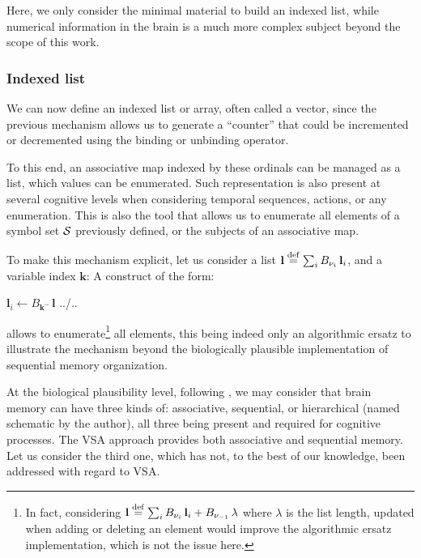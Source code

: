\documentclass[sn-mathphys]{sn-jnl}
\newcommand{\defq}{\stackrel {\rm def}{=}}
\begin{document}
Here, we only consider the minimal material to build an indexed list, while numerical information in the brain is a much more complex subject \cite{nieder_representation_2007} beyond the scope of this work.

\subsubsection{Indexed list} 
We can now define an indexed list or array, often called a vector, since the previous mechanism allows us to generate a ``counter'' that could be incremented or decremented using the binding or unbinding operator.

To this end, an associative map indexed by these ordinals can be managed as a list, which values can be enumerated. Such representation is also present at several cognitive levels when considering temporal sequences, actions, or any enumeration. This is also the tool that allows us to enumerate all elements of a symbol set ${\cal S}$ previously defined, or the subjects of an associative map.

To make this mechanism explicit, let us consider a list $\mathbf{l} \defq \sum_i B_{\mathbf{\nu}_i} \, \mathbf{l}_i$, and a variable index $\mathbf{k}$: A construct of the form:
\begin{algorithmic}
   \State $\mathbf{l}_i \leftarrow B_{\mathbf{k}^\sim} \, \mathbf{l}$
\State ../..
\EndFor
\end{algorithmic}
allows to enumerate\footnote{In fact, considering $\mathbf{l} \defq \sum_i B_{\mathbf{\nu}_i} \, \mathbf{l}_i + B_{\mathbf{\nu}_{-1}} \, \lambda$ where $\lambda$ is the list length, updated when adding or deleting an element would improve the algorithmic ersatz implementation, which is not the issue here.} all elements, this being indeed only an algorithmic ersatz to illustrate the mechanism beyond the biologically plausible implementation of sequential memory organization.

At the biological plausibility level, following \cite{eichenbaum_memory_2017}, we may consider that brain memory can have three kinds of: associative, sequential, or hierarchical (named schematic by the author), all three being present and required for cognitive processes. The VSA approach provides both associative and sequential memory. Let us consider the third one, which has not, to the best of our knowledge, been addressed with regard to VSA.
\end{document}
